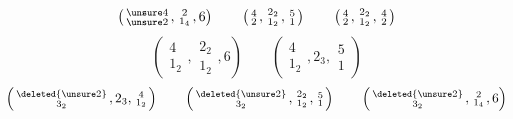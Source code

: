 \[
\left(\begin{smallmatrix}\unsure4\\\unsure2\end{smallmatrix},\begin{smallmatrix}2\\1_4\end{smallmatrix},6\right)\qquad \left(\begin{smallmatrix}4\\2\end{smallmatrix},\begin{smallmatrix}2_2\\1_2\end{smallmatrix},\begin{smallmatrix}5\\1\end{smallmatrix}\right)\qquad \left(\begin{smallmatrix}4\\2\end{smallmatrix},\begin{smallmatrix}2_2\\1_2\end{smallmatrix},\begin{smallmatrix}4\\2\end{smallmatrix}\right)
\]
\[
\left(\begin{smallmatrix}4\\1_2\end{smallmatrix},\begin{smallmatrix}2_2\\1_2\end{smallmatrix},6\right)\qquad \left(\begin{smallmatrix}4\\1_2\end{smallmatrix},2_3,\begin{smallmatrix}5\\1\end{smallmatrix}\right)
\]
\[
\left(\begin{smallmatrix}\deleted{\unsure2}\\3_2\end{smallmatrix},2_3,\begin{smallmatrix}4\\1_2\end{smallmatrix}\right)\qquad \left(\begin{smallmatrix}\deleted{\unsure2}\\3_2\end{smallmatrix},\begin{smallmatrix}2_2\\1_2\end{smallmatrix},\begin{smallmatrix}5\\1\end{smallmatrix}\right)\qquad \left(\begin{smallmatrix}\deleted{\unsure2}\\3_2\end{smallmatrix},\begin{smallmatrix}2\\1_4\end{smallmatrix},6\right)
\]

